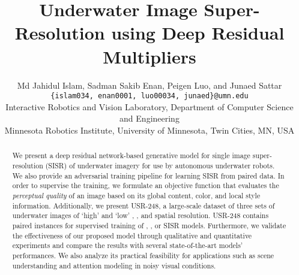 \documentclass[10pt,twocolumn,letterpaper]{article}
\begin{document}
\newcommand{\hly}{\colorbox{yellow}}
\newcommand{\hlg}{\colorbox{green}}
\newcommand{\hlp}{\colorbox{pink}}


\title{Underwater Image Super-Resolution using Deep Residual Multipliers}

\author{ Md Jahidul Islam, Sadman Sakib Enan, Peigen Luo, and Junaed Sattar \\	
{\tt\small \{islam034, enan0001, luo00034, junaed\}@umn.edu} \\
{\small Interactive Robotics and Vision Laboratory, Department of Computer Science and Engineering} \\ 
{\small Minnesota Robotics Institute, University of Minnesota, Twin Cities, MN, USA }
}


\maketitle


\begin{abstract}
We present a deep residual network-based generative model for single image super-resolution (SISR) of underwater imagery for use by autonomous underwater robots. We also provide an adversarial training pipeline for learning SISR from paired data. In order to supervise the training, we formulate an objective function that evaluates the \textit{perceptual quality} of an image based on its global content, color, and local style information. Additionally, we present USR-248, a large-scale dataset of three sets of underwater images of `high'  and `low' , , and  spatial resolution. USR-248 contains paired instances for supervised training of , , or  SISR models. Furthermore, we validate the effectiveness of our proposed model through qualitative and quantitative experiments and compare the results with several state-of-the-art models' performances. We also analyze its practical feasibility for applications such as scene understanding and attention modeling in noisy visual conditions.
\end{abstract}
\end{document}
